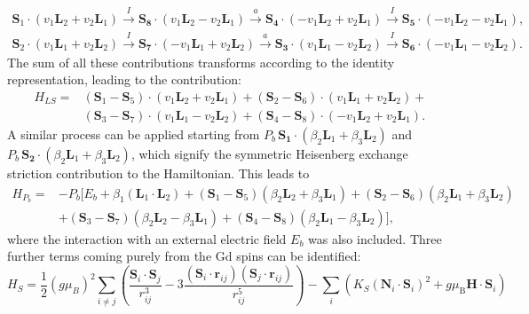 \begin{align}
	\mathbf{S}_1\cdot(v_1 \mathbf{L}_2 + v_2 \mathbf{L}_1) \xrightarrow{I} \mathbf{S_8}\cdot(v_1 \mathbf{L}_2 - v_2 \mathbf{L}_1) \xrightarrow{a} \mathbf{S_4} \cdot (- v_1 \mathbf{L}_2 + v_2 \mathbf{L}_1) \xrightarrow{I} \mathbf{S_5} \cdot (-v_1 \mathbf{L}_2 - v_2 \mathbf{L}_1), \nonumber\\
	\mathbf{S}_2\cdot(v_1 \mathbf{L}_1 + v_2 \mathbf{L}_2) \xrightarrow{I} \mathbf{S_7}\cdot(-v_1 \mathbf{L}_1 + v_2 \mathbf{L}_2) \xrightarrow{a} \mathbf{S_3} \cdot (v_1 \mathbf{L}_1 - v_2 \mathbf{L}_2) \xrightarrow{I} \mathbf{S_6} \cdot (-v_1 \mathbf{L}_1 - v_2 \mathbf{L}_2).
\end{align}
The sum of all these contributions transforms according to the identity representation, leading to the contribution:
\begin{align}
    H_{LS} =& (\mathbf{S}_1 - \mathbf{S}_5) \cdot (v_1 \mathbf{L}_2 + v_2 \mathbf{L}_1) + (\mathbf{S}_2 - \mathbf{S}_6) \cdot (v_1 \mathbf{L}_1 + v_2 \mathbf{L}_2) + \nonumber \\ &(\mathbf{S}_3 - \mathbf{S}_7) \cdot (v_1 \mathbf{L}_1 - v_2 \mathbf{L}_2) + (\mathbf{S}_4 - \mathbf{S}_8) \cdot (-v_1 \mathbf{L}_2 + v_2 \mathbf{L}_1).
\end{align}
A similar process can be applied starting from $P_b \, \mathbf{S_1}\cdot(\beta_2 \mathbf{L}_1 + \beta_3 \mathbf{L}_2)$ and $P_b\, \mathbf{S_2}\cdot(\beta_2 \mathbf{L}_1 + \beta_3 \mathbf{L}_2)$, which signify the symmetric Heisenberg exchange striction contribution to the Hamiltonian. This leads to
\begin{align}
	H_{P_b}=&-P_b[E_b + \beta_1 (\mathbf{L}_1\cdot \mathbf{L}_2)+
    (\mathbf{S}_1-\mathbf{S}_5)(\beta_2 \mathbf{L}_2 + \beta_3 \mathbf{L}_1) +
    (\mathbf{S}_2-\mathbf{S}_6)(\beta_2 \mathbf{L}_1 + \beta_3 \mathbf{L}_2) \nonumber\\ 
    &+(\mathbf{S}_3-\mathbf{S}_7)(\beta_2 \mathbf{L}_2 - \beta_3 \mathbf{L}_1) +
    (\mathbf{S}_4-\mathbf{S}_8)(\beta_2 \mathbf{L}_1 - \beta_3 \mathbf{L}_2)],
\end{align}
where the interaction with an external electric field $E_b$ was also included. 
Three further terms coming purely from the Gd spins can be identified:
\begin{equation}
     H_S=\frac{1}{2}(g \mu_B)^2\sum_{i\neq j}\left(\frac{\mathbf{S}_i\cdot \mathbf{S}_j}{r_{ij}^3}-3\frac{(\mathbf{S}_i\cdot \mathbf{r}_{ij})(\mathbf{S}_j\cdot \mathbf{r}_{ij})}{r_{ij}^5}\right) - \sum_i\left( K_S(\mathbf{N}_i\cdot \mathbf{S}_i)^2 + g\mu_\mathrm{B} \mathbf{H} \cdot \mathbf{S}_i\right) 
\end{equation}
